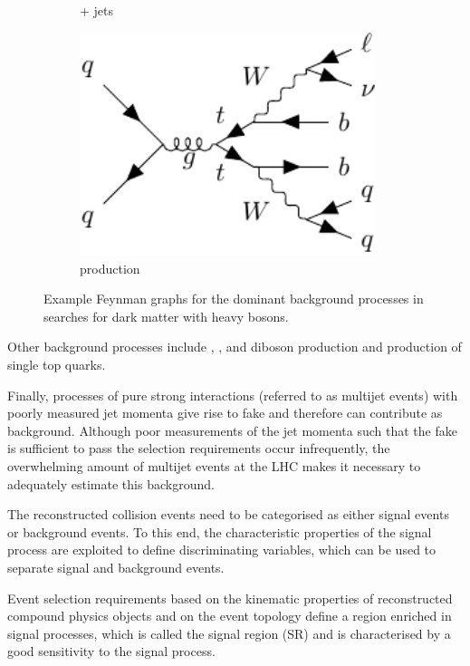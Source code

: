 \begin{figure}[htbp]
\begin{subfigure}{0.3\textwidth}
      \caption{\PW + jets}
    \end{subfigure}
    \hfill
    \begin{subfigure}{0.3\textwidth}
      \centering
      \includegraphics[width=0.95\textwidth]{figures/common/physics/ttbar.pdf}
      \caption{\ttbar production}
    \end{subfigure}
    \caption{Example Feynman graphs for the dominant background processes in searches for dark matter with heavy bosons.}
    \label{fig:common:analysis:backgroundgraphs}
\end{figure}

Other background processes include \HepProcess{\PW \PW}, \HepProcess{\PW \PZ}, and \HepProcess{\PZ \PZ} diboson production and production of single top quarks.

Finally, processes of pure strong interactions (referred to as multijet events) with poorly measured jet momenta give rise to fake \met and therefore can contribute as background. Although poor measurements of the jet momenta such that the fake \met is sufficient to pass the selection requirements occur infrequently, the overwhelming amount of multijet events at the LHC makes it necessary to adequately estimate this background.

The reconstructed \HepProcess{\Pp\Pp} collision events need to be categorised as either signal events or background events. To this end, the characteristic properties of the signal process are exploited to define discriminating variables, which can be used to separate signal and background events.

Event selection requirements based on the kinematic properties of reconstructed compound physics objects and on the event topology define a region enriched in signal processes, which is called the signal region (SR) and is characterised by a good sensitivity to the signal process.

